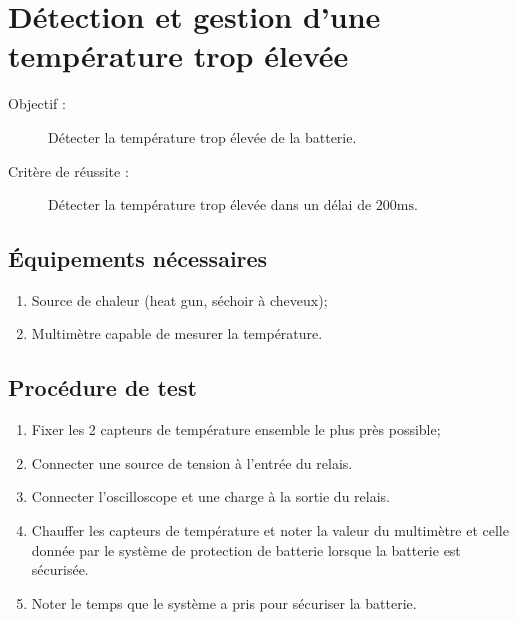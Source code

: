 
\section{Détection et gestion d'une température trop élevée}

\begin{description}
	\item[Objectif :] Détecter la température trop élevée de la batterie.
	\item[Critère de réussite :] Détecter la température trop élevée dans un délai de $200\text{ms}$.
\end{description}

\subsection*{Équipements nécessaires}
\begin{enumerate}
	\item Source de chaleur (heat gun, séchoir à cheveux);
	\item Multimètre capable de mesurer la température.
\end{enumerate}	

\subsection*{Procédure de test}
\begin{enumerate}
	\item Fixer les 2 capteurs de température ensemble le plus près possible; 
	\item Connecter une source de tension à l'entrée du relais.
	\item Connecter l'oscilloscope et une charge à la sortie du relais.
	\item Chauffer les capteurs de température et noter la valeur du multimètre et celle donnée par le système de protection de batterie lorsque la batterie est sécurisée.
	\item Noter le temps que le système a pris pour sécuriser la batterie.
\end{enumerate}